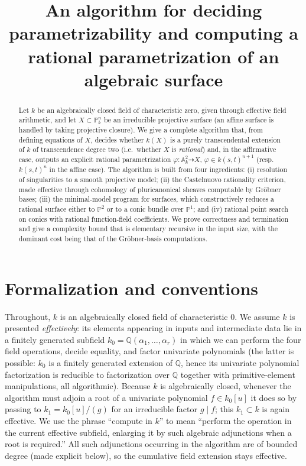 \documentclass{amsart}
\theoremstyle{plain}
\theoremstyle{definition}
\newcommand{\PP}{\mathbb{P}}
\newcommand{\AA}{\mathbb{A}}
\begin{document}
\title{An algorithm for deciding parametrizability and computing a rational
parametrization of an algebraic surface}
\maketitle

\begin{abstract}
Let $k$ be an algebraically closed field of characteristic zero, given through
effective field arithmetic, and let $X\subset\PP^n_k$ be an irreducible
projective surface (an affine surface is handled by taking projective closure).
We give a complete algorithm that, from defining equations of $X$, decides
whether $k(X)$ is a purely transcendental extension of $k$ of transcendence
degree two (i.e.\ whether $X$ is \emph{rational}) and, in the affirmative case,
outputs an explicit rational parametrization $\varphi\colon\AA^2_k\dashrightarrow
X$, $\varphi\in k(s,t)^{n+1}$ (resp.\ $k(s,t)^n$ in the affine case).  The
algorithm is built from four ingredients: (i) resolution of singularities to a
smooth projective model; (ii) the Castelnuovo rationality criterion, made
effective through cohomology of pluricanonical sheaves computable by Gr\"obner
bases; (iii) the minimal-model program for surfaces, which constructively
reduces a rational surface either to $\PP^2$ or to a conic bundle over $\PP^1$;
and (iv) rational point search on conics with rational function-field
coefficients. We prove correctness and termination and give a complexity bound
that is elementary recursive in the input size, with the dominant cost being
that of the Gr\"obner-basis computations.
\end{abstract}

\section{Formalization and conventions}

Throughout, $k$ is an algebraically closed field of characteristic $0$.  We
assume $k$ is presented \emph{effectively}: its elements appearing in inputs and
intermediate data lie in a finitely generated subfield
$k_0=\mathbb{Q}(\alpha_1,\dots,\alpha_r)$ in which we can perform the four field
operations, decide equality, and factor univariate polynomials (the latter is
possible: $k_0$ is a finitely generated extension of $\mathbb{Q}$, hence its
univariate polynomial factorization is reducible to factorization over
$\mathbb{Q}$ together with primitive-element manipulations, all algorithmic).
Because $k$ is algebraically closed, whenever the algorithm must adjoin a root
of a univariate polynomial $f\in k_0[u]$ it does so by passing to
$k_1=k_0[u]/(g)$ for an irreducible factor $g\mid f$; this $k_1\subset k$ is
again effective.  We use the phrase ``compute in $k$'' to mean ``perform the
operation in the current effective subfield, enlarging it by such algebraic
adjunctions when a root is required.''  All such adjunctions occurring in the
algorithm are of bounded degree (made explicit below), so the cumulative field
extension stays effective.
\end{document}
